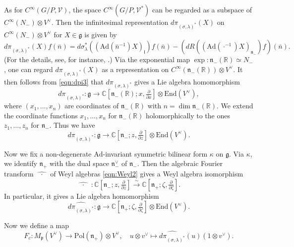 \documentclass[reqno,11pt]{amsart}
\theoremstyle{remark}
\theoremstyle{definition}
\numberwithin{equation}{section}
\newcommand{\fg}{{\mathfrak g}}
\newcommand{\fl}{{\mathfrak l}}
\newcommand{\fn}{{\mathfrak n}}
\newcommand{\fp}{{\mathfrak p}}
\newcommand{\R}{\mathbb{R}}
\newcommand{\C}{\mathbb{C}}
\newcommand{\Ad}{\mathrm{Ad}}
\newcommand{\Pol}{\mathrm{Pol}}
\newcommand{\To}{\longrightarrow}
\newcommand{\dpi}{d\pi}
\begin{document}
As for $C^\infty(G/P,\mathcal{V})$,
the space $C^\infty(G/P,\mathcal{V}^*)$ can be regarded as 
a subspace of $C^\infty(N_-) \otimes V^\vee$.
Then the infinitesimal representation $d\pi_{(\sigma,\lambda)^*}(X)$
on $C^\infty(N_-)\otimes V^\vee$
for $X \in \fg$ is given by
\begin{equation}\label{eqn:dpi3}
d\pi_{(\sigma,\lambda)^*}(X)f(\bar{n})
=d\sigma_\lambda^*((\Ad(\bar{n}^{-1})X)_\fl)f(\bar{n})
-\left(dR((\Ad(\cdot^{-1})X)_{\fn_-})f\right)(\bar{n}).
\end{equation}
(For the details, see, for instance, \cite[Sect.\ 2]{KuOr24}.)
Via the exponential map $\exp\colon \fn_-(\R) \simeq N_-$, one can regard
$\dpi_{(\sigma,\lambda)^*}(X)$ as a representation 
on $C^\infty(\mathfrak{n}_-(\R)) \otimes V^\vee$.
It then follows from \eqref{eqn:dpi3} that 
$\dpi_{(\sigma,\lambda)^*}$ gives a Lie algebra homomorphism
\begin{equation*}
d\pi_{(\sigma,\lambda)^*}\colon \mathfrak{g} \To 
\C[\fn_-(\R);x, \tfrac{\partial}{\partial x}]  \otimes \mathrm{End}(V^\vee),
\end{equation*}
where $(x_1, \ldots, x_n)$ are coordinates of $\fn_-(\R)$ with $n=\dim \fn_-(\R)$.
We extend the coordinate functions $x_1,\ldots, x_n$ for $\fn_-(\R)$ 
holomorphically to the ones $z_1, \ldots, z_n$ for $\fn_-$.
Thus we have 
\begin{equation*}
d\pi_{(\sigma,\lambda)^*}\colon \mathfrak{g} \To 
\C[\fn_-;z, \tfrac{\partial}{\partial z}]  \otimes \mathrm{End}(V^\vee).
\end{equation*}

Now we fix a non-degenerate $\Ad$-invariant symmetric bilinear form $\kappa$ on
$\fg$. Via $\kappa$, we identify 
$\fn_+$  with the dual space $\fn_-^\vee$ of 
$\fn_-$. Then
the algebraic Fourier transform $\widehat{\;\;\cdot\;\;}$
of Weyl algebras \eqref{eqn:Weyl2} gives a Weyl algebra isomorphism
\begin{equation*}
\widehat{\;\;\cdot\;\;}\;\colon
\C[\fn_-;z, \tfrac{\partial}{\partial z}] 
\stackrel{\sim}{\To} 
\C[\fn_+;\zeta, \tfrac{\partial}{\partial \zeta}].
\end{equation*}
In particular, it gives a Lie algebra homomorphism
\begin{equation}\label{eqn:hdpi}
\widehat{d\pi_{(\sigma,\lambda)^*}}\colon \mathfrak{g} \To 
\C[\fn_+;\zeta, \tfrac{\partial}{\partial \zeta}]\otimes \mathrm{End}(V^\vee).
\end{equation}

Now we define a map
\begin{equation}\label{eqn:Fc}
F_c\colon M_\fp(V^\vee) 
\To
\Pol(\fn_+) \otimes V^\vee,
\quad u\otimes v^\vee \longmapsto 
\widehat{d\pi_{(\sigma,\lambda)^*}}(u)(1\otimes v^\vee).
\end{equation}
\end{document}
